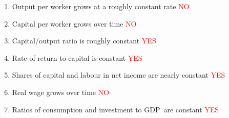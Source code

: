 \documentclass[notes=show]{beamer}
\begin{document}
\begin{frame}%


\begin{enumerate}
\item Output per worker grows at a roughly constant rate 
\textcolor{red}{NO}%

\item Capital per worker grows over time 
\textcolor{red}{NO}%

\item Capital/output ratio is roughly constant 
\textcolor{red}{YES}%

\item Rate of return to capital is constant 
\textcolor{red}{YES}%

\item Shares of capital and labour in net income are nearly constant 
\textcolor{red}{YES}%

\item Real wage grows over time 
\textcolor{red}{NO}%

\item Ratios of consumption and investment to GDP\ are constant 
\textcolor{red}{YES}%
\end{enumerate}

\transboxout%
\end{frame}%
\end{document}
